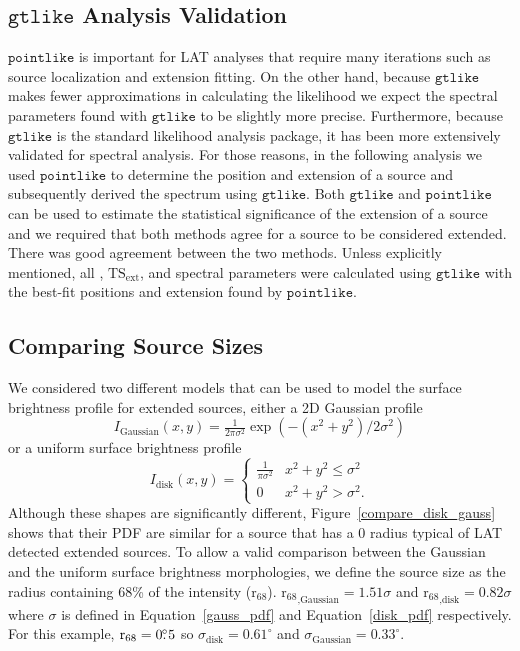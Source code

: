 \documentclass[12pt,preprint]{aastex}
\newcommand{\tsext}{{\ensuremath{\text{TS}_{\text{ext}}}}\xspace}
\newcommand{\rsixeight}{{\ensuremath{\text{r}_{68}}}\xspace}
\newcommand{\ts}{\text{TS}\xspace}
\newcommand{\gtlike}{\ensuremath{\mathtt{gtlike}}\xspace}
\newcommand{\pointlike}{\ensuremath{\mathtt{pointlike}}\xspace}
\newcommand{\degree}{^\circ\xspace}
\begin{document}
\subsection{\gtlike Analysis Validation}
\label{gtlike_crosscheck}

\pointlike is important for LAT analyses that require many iterations
such as source localization and extension fitting.  On the other hand,
because \gtlike makes fewer approximations in calculating the likelihood
we expect the spectral parameters found with \gtlike to be slightly more
precise.  Furthermore, because \gtlike is the standard likelihood analysis
package, it has been more extensively validated for spectral analysis.
For those reasons, in the following analysis we used \pointlike to
determine the position and extension of a source and subsequently derived
the spectrum using \gtlike. Both \gtlike and \pointlike can be used to
estimate the statistical significance of the extension of a source and we
required that both methods agree for a source to be considered extended.
There was good agreement between the two methods.  Unless explicitly
mentioned, all \ts, \tsext, and spectral parameters were calculated using
\gtlike with the best-fit positions and extension found by \pointlike.


\subsection{Comparing Source Sizes}

\label{compare_source_size}

We considered two different models that can be used to model the
surface brightness profile for extended sources, either a 2D Gaussian
profile
\begin{equation}\label{gauss_pdf}
  I_\text{Gaussian}(x,y)=\tfrac{1}{2\pi\sigma^2}\exp\left(-(x^2+y^2)/2\sigma^2\right)
\end{equation}
or a uniform surface brightness profile
\begin{equation}\label{disk_pdf}
  I_\text{disk}(x,y)=
  \begin{cases}
    \frac{1}{\pi\sigma^2} & x^2+y^2\le\sigma^2 \\
    0                      & x^2+y^2>\sigma^2.
  \end{cases}
\end{equation}
Although these shapes are significantly different, 
Figure~\ref{compare_disk_gauss} shows that their PDF 
are similar for a source that has a 
0
radius
typical of LAT detected extended sources.
To
allow a valid comparison between the Gaussian and the uniform surface
brightness morphologies,
we define the source size 
as the radius containing
68\% of the intensity ($\rsixeight$).  $\rsixeight_\text{,Gaussian}=1.51\sigma$
and $\rsixeight_\text{,disk}=0.82\sigma$ where $\sigma$
is defined in Equation~\ref{gauss_pdf} and
Equation~\ref{disk_pdf} respectively.
For this example, $\rsixeight=0\fdg5$ so
$\sigma_\text{disk}=0.61\degree$ and 
$\sigma_\text{Gaussian}=0.33\degree$.
\end{document}
